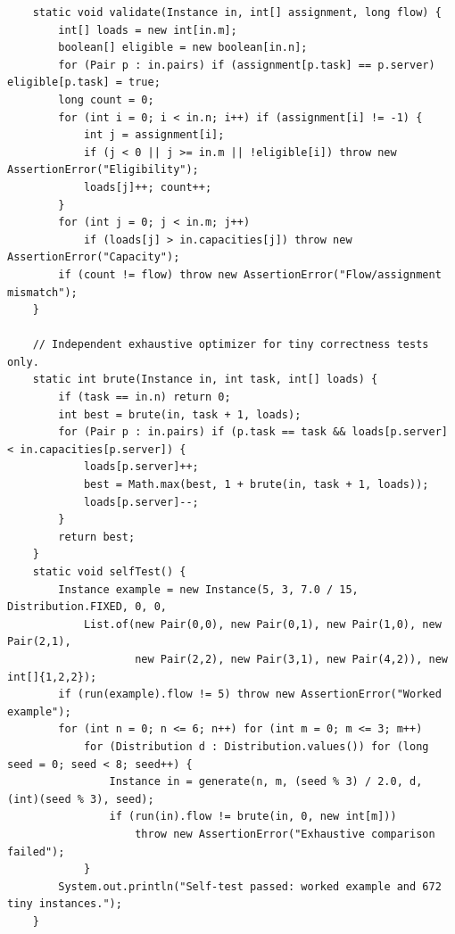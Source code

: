 \documentclass[conference]{IEEEtran}
\theoremstyle{definition}
\theoremstyle{remark}
\begin{document}
\begin{lstlisting}
    static void validate(Instance in, int[] assignment, long flow) {
        int[] loads = new int[in.m];
        boolean[] eligible = new boolean[in.n];
        for (Pair p : in.pairs) if (assignment[p.task] == p.server) eligible[p.task] = true;
        long count = 0;
        for (int i = 0; i < in.n; i++) if (assignment[i] != -1) {
            int j = assignment[i];
            if (j < 0 || j >= in.m || !eligible[i]) throw new AssertionError("Eligibility");
            loads[j]++; count++;
        }
        for (int j = 0; j < in.m; j++)
            if (loads[j] > in.capacities[j]) throw new AssertionError("Capacity");
        if (count != flow) throw new AssertionError("Flow/assignment mismatch");
    }

    // Independent exhaustive optimizer for tiny correctness tests only.
    static int brute(Instance in, int task, int[] loads) {
        if (task == in.n) return 0;
        int best = brute(in, task + 1, loads);
        for (Pair p : in.pairs) if (p.task == task && loads[p.server] < in.capacities[p.server]) {
            loads[p.server]++;
            best = Math.max(best, 1 + brute(in, task + 1, loads));
            loads[p.server]--;
        }
        return best;
    }
    static void selfTest() {
        Instance example = new Instance(5, 3, 7.0 / 15, Distribution.FIXED, 0, 0,
            List.of(new Pair(0,0), new Pair(0,1), new Pair(1,0), new Pair(2,1),
                    new Pair(2,2), new Pair(3,1), new Pair(4,2)), new int[]{1,2,2});
        if (run(example).flow != 5) throw new AssertionError("Worked example");
        for (int n = 0; n <= 6; n++) for (int m = 0; m <= 3; m++)
            for (Distribution d : Distribution.values()) for (long seed = 0; seed < 8; seed++) {
                Instance in = generate(n, m, (seed % 3) / 2.0, d, (int)(seed % 3), seed);
                if (run(in).flow != brute(in, 0, new int[m]))
                    throw new AssertionError("Exhaustive comparison failed");
            }
        System.out.println("Self-test passed: worked example and 672 tiny instances.");
    }


\end{lstlisting}
\end{document}
